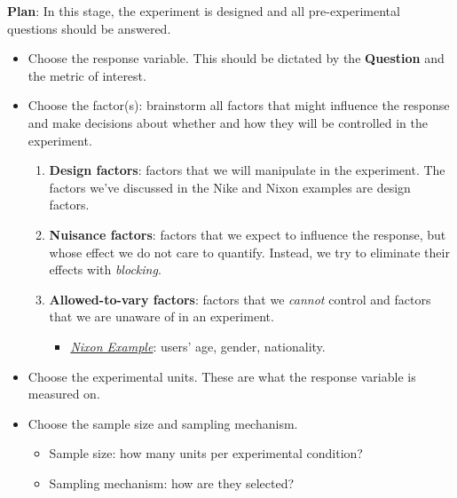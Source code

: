 \begin{framed}
    \textbf{Plan}: In this stage, the experiment is designed and all pre-experimental questions
    should be answered.
    \begin{itemize}
        \item Choose the response variable. This should be dictated by the \textbf{Question} and the metric
              of interest.
        \item Choose the factor(s): brainstorm all factors that might influence the response and make
              decisions about whether and how they will be controlled in the experiment.
              \begin{enumerate}[i]
                  \item \textbf{Design factors}: factors that we will manipulate in the experiment.
                        The factors we've discussed in the Nike and Nixon examples are design factors.
                  \item \textbf{Nuisance factors}: factors that we expect to influence
                        the response, but whose effect we do not care to quantify. Instead, we try to eliminate
                        their effects with \emph{blocking}.
                  \item \textbf{Allowed-to-vary factors}: factors that we \emph{cannot} control and factors that
                        we are unaware of in an experiment.
                        \begin{itemize}
                            \item \emph{\hyperref[ex:nixon_ex]{Nixon Example}}:
                                  users' age, gender, nationality.
                        \end{itemize}
              \end{enumerate}
        \item Choose the experimental units. These are what the response variable is measured on.
        \item Choose the sample size and sampling mechanism.
              \begin{itemize}
                  \item Sample size: how many units per experimental condition?
                  \item Sampling mechanism: how are they selected?
              \end{itemize}
    \end{itemize}
\end{framed}
